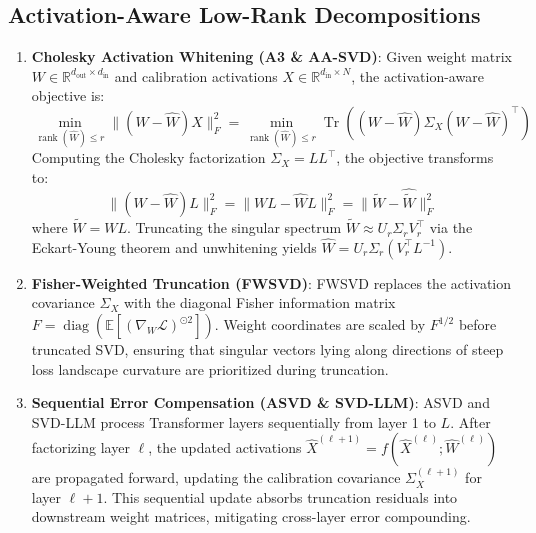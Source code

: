 \documentclass{article}
\begin{document}
\subsection{Activation-Aware Low-Rank Decompositions}
\begin{enumerate}
    \item \textbf{Cholesky Activation Whitening (A3 \& AA-SVD)}:
    Given weight matrix $W \in \mathbb{R}^{d_{\text{out}} \times d_{\text{in}}}$ and calibration activations $X \in \mathbb{R}^{d_{\text{in}} \times N}$, the activation-aware objective is:
    \begin{equation}
        \min_{\operatorname{rank}(\hat{W}) \le r} \|(W - \hat{W}) X\|_F^2 = \min_{\operatorname{rank}(\hat{W}) \le r} \operatorname{Tr}\left( (W - \hat{W}) \Sigma_X (W - \hat{W})^\top \right)
    \end{equation}
    Computing the Cholesky factorization $\Sigma_X = L L^\top$, the objective transforms to:
    \begin{equation}
        \|(W - \hat{W}) L\|_F^2 = \|W L - \hat{W} L\|_F^2 = \|\tilde{W} - \hat{\tilde{W}}\|_F^2
    \end{equation}
    where $\tilde{W} = W L$. Truncating the singular spectrum $\tilde{W} \approx U_r \Sigma_r V_r^\top$ via the Eckart-Young theorem and unwhitening yields $\hat{W} = U_r \Sigma_r (V_r^\top L^{-1})$.
    \item \textbf{Fisher-Weighted Truncation (FWSVD)}:
    FWSVD \citep{fwsvd_2026} replaces the activation covariance $\Sigma_X$ with the diagonal Fisher information matrix $F = \operatorname{diag}(\mathbb{E}[(\nabla_W \mathcal{L})^{\odot 2}])$. Weight coordinates are scaled by $F^{1/2}$ before truncated SVD, ensuring that singular vectors lying along directions of steep loss landscape curvature are prioritized during truncation.
    \item \textbf{Sequential Error Compensation (ASVD \& SVD-LLM)}:
    ASVD \citep{yuan2023asvd} and SVD-LLM \citep{wang2024svdllm} process Transformer layers sequentially from layer 1 to $L$. After factorizing layer $\ell$, the updated activations $\hat{X}^{(\ell+1)} = f(\hat{X}^{(\ell)}; \hat{W}^{(\ell)})$ are propagated forward, updating the calibration covariance $\Sigma_X^{(\ell+1)}$ for layer $\ell+1$. This sequential update absorbs truncation residuals into downstream weight matrices, mitigating cross-layer error compounding.
\end{enumerate}
\end{document}
